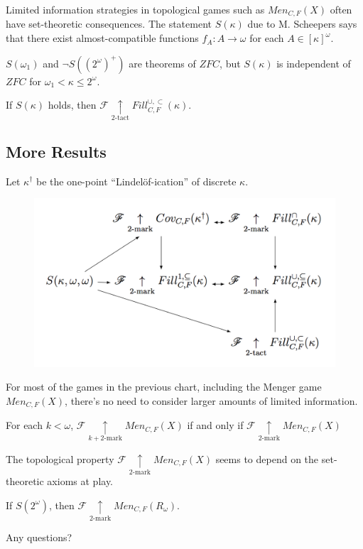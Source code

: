 \documentclass{beamer}
\theoremstyle{definition}
\newcommand{\kmarkwin}[1]{\underset{#1\text{-mark}}{\uparrow}}
\newcommand{\ktactwin}[1]{\underset{#1\text{-tact}}{\uparrow}}
\newcommand{\oneptlind}[1]{#1^\dagger}
\newcommand{\menGame}[1]{Men_{C,F}\left({#1}\right)}
\newcommand{\cloFillStrictGame}[1]{Fill^{\cup,\subset}_{C,F}\left({#1}\right)}
\newcommand{\<}{\langle}
\renewcommand{\>}{\rangle}
\newcommand{\alcompS}[1]{S(#1)}
\newcommand{\pl}[1]{\mathscr{#1}}
\begin{document}
\begin{frame}
  Limited information strategies in topological games such as
  $\menGame{X}$ often have set-theoretic
  consequences. The statement $\alcompS\kappa$ due to M. Scheepers
  \cite{MR1129143} says that there exist
  almost-compatible functions $f_A:A\to\omega$ for each $A\in[\kappa]^\omega$.

  \begin{theorem}
    $\alcompS{\omega_1}$ and $\neg\alcompS{(2^\omega)^+}$ are theorems
    of $ZFC$, but $\alcompS\kappa$ is independent of $ZFC$ for
    $\omega_1<\kappa\leq 2^\omega$.
  \end{theorem}

  \begin{theorem}
    If $\alcompS{\kappa}$ holds, then
    $\pl F\ktactwin2 \cloFillStrictGame{\kappa}$.
  \end{theorem}
\end{frame}

\subsection{More Results}

\begin{frame}
  Let $\oneptlind\kappa$ be the one-point ``Lindel\"of-ication'' of
  discrete $\kappa$.

  \begin{theorem}
    \begin{figure}
      \includegraphics[width=0.6\linewidth]{mengerGameChart.png}
    \end{figure}
  \end{theorem}
\end{frame}

\begin{frame}\small
  For most of the games in the previous chart, including the Menger game
  $\menGame{X}$, there's no need to consider larger amounts of limited
  information.

  \begin{theorem}
    For each $k<\omega$,
    $\pl F\kmarkwin{k+2}\menGame{X}$ if and only if
    $\pl F\kmarkwin2\menGame{X}$
  \end{theorem}

  The topological property $\pl F\kmarkwin2\menGame{X}$ seems to
  depend on the set-theoretic axioms at play.

  \begin{theorem}
    If $\alcompS{2^\omega}$, then $\pl F\kmarkwin2\menGame{R_\omega}$.
  \end{theorem}
\end{frame}


\begin{frame}[allowframebreaks]
  \tiny
  
  
\end{frame}

\begin{frame}
  Any questions?
\end{frame}
\end{document}
